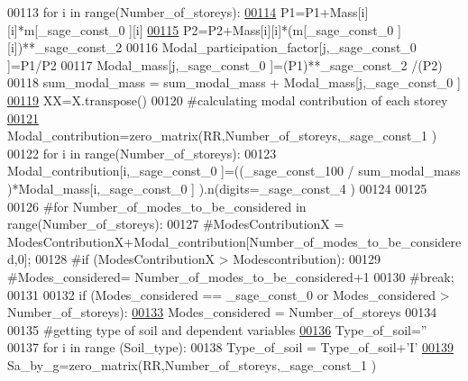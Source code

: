 \begin{DoxyCode}
00113         \textcolor{keywordflow}{for} i \textcolor{keywordflow}{in} range(Number\_of\_storeys):
\hypertarget{main_8sage_8py_source_l00114}{}\hyperlink{namespacemain_add7e0394c94a2e2115aff785eb6995e3}{00114}             P1=P1+Mass[i][i]*m[\_sage\_const\_0 ][i]
\hypertarget{main_8sage_8py_source_l00115}{}\hyperlink{namespacemain_a1b83b7a3849a8e1c84b9906c45625fec}{00115}             P2=P2+Mass[i][i]*(m[\_sage\_const\_0 ][i])**\_sage\_const\_2 
00116         Modal\_participation\_factor[j,\_sage\_const\_0 ]=P1/P2
00117         Modal\_mass[j,\_sage\_const\_0 ]=(P1)**\_sage\_const\_2 /(P2)
00118         sum\_modal\_mass = sum\_modal\_mass + Modal\_mass[j,\_sage\_const\_0 ]
\hypertarget{main_8sage_8py_source_l00119}{}\hyperlink{namespacemain_ae18df6a00aee4516c7ad8961b666e2a3}{00119} XX=X.transpose()
00120 \textcolor{comment}{#calculating modal contribution of each storey}
\hypertarget{main_8sage_8py_source_l00121}{}\hyperlink{namespacemain_ab273c2ae46514d6ec3d905c30cbb5a1b}{00121} Modal\_contribution=zero\_matrix(RR,Number\_of\_storeys,\_sage\_const\_1 )
00122 \textcolor{keywordflow}{for} i \textcolor{keywordflow}{in} range(Number\_of\_storeys):
00123     Modal\_contribution[i,\_sage\_const\_0 ]=((\_sage\_const\_100  / sum\_modal\_mass )*Modal\_mass[i,\_sage\_const\_0 ]
      ).n(digits=\_sage\_const\_4 )
00124 
00125 
00126 \textcolor{comment}{#for Number\_of\_modes\_to\_be\_considered in range(Number\_of\_storeys):}
00127     \textcolor{comment}{#ModesContributionX = ModesContributionX+Modal\_contribution[Number\_of\_modes\_to\_be\_considered,0];}
00128     \textcolor{comment}{#if (ModesContributionX > Modescontribution):}
00129         \textcolor{comment}{#Modes\_considered= Number\_of\_modes\_to\_be\_considered+1}
00130         \textcolor{comment}{#break;}
00131         
00132 \textcolor{keywordflow}{if} (Modes\_considered == \_sage\_const\_0  \textcolor{keywordflow}{or} Modes\_considered > Number\_of\_storeys):
\hypertarget{main_8sage_8py_source_l00133}{}\hyperlink{namespacemain_a9d22ac077c22a97b1b095068a1500d16}{00133}     Modes\_considered = Number\_of\_storeys
00134     
00135 \textcolor{comment}{#getting type of soil and dependent variables}
\hypertarget{main_8sage_8py_source_l00136}{}\hyperlink{namespacemain_a52e65712caa18dade1326ad4efeebfa1}{00136} Type\_of\_soil=\textcolor{stringliteral}{''}
00137 \textcolor{keywordflow}{for} i \textcolor{keywordflow}{in} range (Soil\_type):
00138    Type\_of\_soil = Type\_of\_soil+\textcolor{stringliteral}{'I'}
\hypertarget{main_8sage_8py_source_l00139}{}\hyperlink{namespacemain_ac3a509169246622b50fc23d809d30833}{00139} Sa\_by\_g=zero\_matrix(RR,Number\_of\_storeys,\_sage\_const\_1 )

\end{DoxyCode}

